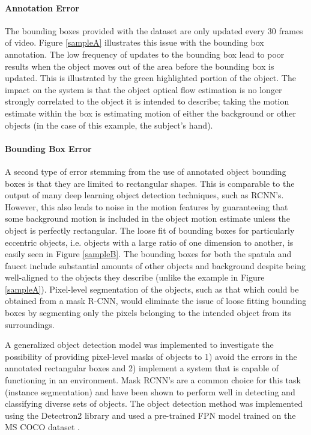 \documentclass[12pt]{report}
\begin{document}
\paragraph{Annotation Error}
The bounding boxes provided with the dataset are only updated every 30 frames of video. Figure \ref{sampleA} illustrates this issue with the bounding box annotation. The low frequency of updates to the bounding box lead to poor results when the object moves out of the area before the bounding box is updated. This is illustrated by the green highlighted portion of the object. The impact on the system is that the object optical flow estimation is no longer strongly correlated to the object it is intended to describe; taking the motion estimate within the box is estimating motion of either the background or other objects (in the case of this example, the subject's hand).

\paragraph{Bounding Box Error}
A second type of error stemming from the use of annotated object bounding boxes is that they are limited to rectangular shapes. This is comparable to the output of many deep learning object detection techniques, such as RCNN's. However, this also leads to noise in the motion features by guaranteeing that some background motion is included in the object motion estimate unless the object is perfectly rectangular. The loose fit of bounding boxes for particularly eccentric objects, i.e. objects with a large ratio of one dimension to another, is easily seen in Figure \ref{sampleB}. The bounding boxes for both the spatula and faucet include substantial amounts of other objects and background despite being well-aligned to the objects they describe (unlike the example in Figure \ref{sampleA}). Pixel-level segmentation of the objects, such as that which could be obtained from a mask R-CNN, would eliminate the issue of loose fitting bounding boxes by segmenting only the pixels belonging to the intended object from its surroundings.

A generalized object detection model was implemented to investigate the possibility of providing pixel-level masks of objects to 1) avoid the errors in the annotated rectangular boxes and 2) implement a system that is capable of functioning in an environment. Mask RCNN's are a common choice for this task (instance segmentation) and have been shown to perform well in detecting and classifying diverse sets of objects\cite{Cheng2020Panoptic-DeepLab:Segmentation, Chen2019Tensormask:Segmentation, Michaelis2018One-shotSegmentation}. The object detection method was implemented using the Detectron2 library and used a pre-trained FPN model trained on the MS COCO dataset \cite{wu2019detectron2}.
\end{document}
